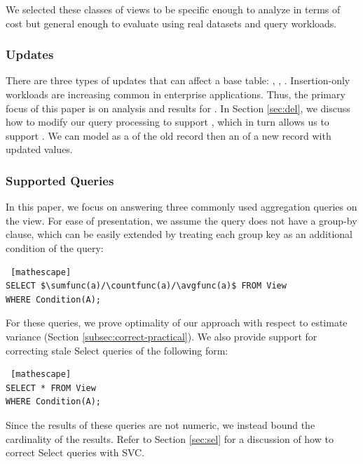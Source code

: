\vspace{0.25em}

We selected these classes of views to be specific enough to analyze in terms of cost but general enough to evaluate using real datasets and query workloads.

\subsubsection{Updates}
There are three types of updates that can affect a base table: \insertion, \delete, \update.
Insertion-only workloads are increasing common \cite{grund2009vertical} in enterprise applications.
Thus, the primary focus of this paper is on analysis and results for \insertion. 
In Section \ref{sec:del}, we discuss how to modify our query processing to support \delete, which in turn allows us to support \update.
We can model \update as a \delete of the old record then an \insertion of a new record with updated values. 

\subsubsection{Supported Queries} \label{subsubsec:queries}
In this paper, we focus on answering three commonly used aggregation queries on the view.
For ease of presentation, we assume the query does not have a group-by clause, which can be easily extended by treating each group key as an additional condition of the query: 
\begin{lstlisting} [mathescape]
SELECT $\sumfunc(a)/\countfunc(a)/\avgfunc(a)$ FROM View 
WHERE Condition(A);
\end{lstlisting}
For these queries, we prove optimality of our approach with respect to estimate variance (Section \ref{subsec:correct-practical}). 
We also provide support for correcting stale Select queries of the following form:
\begin{lstlisting} [mathescape]
SELECT * FROM View 
WHERE Condition(A);
\end{lstlisting}
Since the results of these queries are not numeric, we instead bound the cardinality of the results.
Refer to Section \ref{sec:sel} for a discussion of how to correct Select queries with SVC. 



